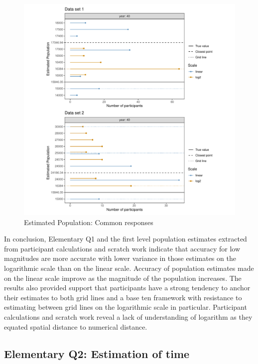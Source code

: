 \documentclass[print]{nuthesis}
\begin{document}
\begin{figure}[tbp]

{\centering \includegraphics[width=1\linewidth,]{thesis_files/figure-latex/common-population-estimates-1} 

}

\caption{Estimated Population: Common responses}\label{fig:common-population-estimates}
\end{figure}

In conclusion, Elementary Q1 and the first level population estimates extracted from participant calculations and scratch work indicate that accuracy for low magnitudes are more accurate with lower variance in those estimates on the logarithmic scale than on the linear scale.
Accuracy of population estimates made on the linear scale improve as the magnitude of the population increases.
The results also provided support that participants have a strong tendency to anchor their estimates to both grid lines and a base ten framework with resistance to estimating between grid lines on the logarithmic scale in particular.
Participant calculations and scratch work reveal a lack of understanding of logarithm as they equated spatial distance to numerical distance.

\hypertarget{elementary-q2-estimation-of-time}{%
\subsection{Elementary Q2: Estimation of time}\label{elementary-q2-estimation-of-time}}
\end{document}
